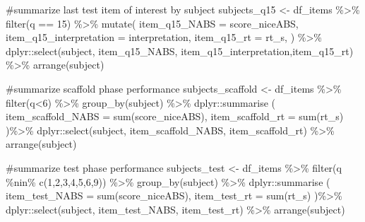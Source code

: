 \documentclass[
  letterpaper,
  DIV=11,
  numbers=noendperiod]{scrreprt}
\newenvironment{Shaded}{\begin{snugshade}}{\end{snugshade}}
\newcommand{\AttributeTok}[1]{\textcolor[rgb]{0.40,0.45,0.13}{#1}}
\newcommand{\CommentTok}[1]{\textcolor[rgb]{0.37,0.37,0.37}{#1}}
\newcommand{\DecValTok}[1]{\textcolor[rgb]{0.68,0.00,0.00}{#1}}
\newcommand{\FunctionTok}[1]{\textcolor[rgb]{0.28,0.35,0.67}{#1}}
\newcommand{\NormalTok}[1]{\textcolor[rgb]{0.00,0.23,0.31}{#1}}
\newcommand{\OtherTok}[1]{\textcolor[rgb]{0.00,0.23,0.31}{#1}}
\newcommand{\SpecialCharTok}[1]{\textcolor[rgb]{0.37,0.37,0.37}{#1}}
\begin{document}
\begin{Shaded}
\begin{Highlighting}[]
\CommentTok{\#summarize last test item of interest by subject}
\NormalTok{subjects\_q15 }\OtherTok{\textless{}{-}}\NormalTok{ df\_items }\SpecialCharTok{\%\textgreater{}\%} \FunctionTok{filter}\NormalTok{(q }\SpecialCharTok{==} \DecValTok{15}\NormalTok{) }\SpecialCharTok{\%\textgreater{}\%} \FunctionTok{mutate}\NormalTok{(}
  \AttributeTok{item\_q15\_NABS =}\NormalTok{ score\_niceABS,}
  \AttributeTok{item\_q15\_interpretation =}\NormalTok{ interpretation,}
  \AttributeTok{item\_q15\_rt =}\NormalTok{ rt\_s,}
\NormalTok{) }\SpecialCharTok{\%\textgreater{}\%}\NormalTok{ dplyr}\SpecialCharTok{::}\FunctionTok{select}\NormalTok{(subject, item\_q15\_NABS, item\_q15\_interpretation,item\_q15\_rt) }\SpecialCharTok{\%\textgreater{}\%} \FunctionTok{arrange}\NormalTok{(subject)}

\CommentTok{\#summarize scaffold phase performance}
\NormalTok{subjects\_scaffold }\OtherTok{\textless{}{-}}\NormalTok{ df\_items }\SpecialCharTok{\%\textgreater{}\%} \FunctionTok{filter}\NormalTok{(q}\SpecialCharTok{\textless{}}\DecValTok{6}\NormalTok{)  }\SpecialCharTok{\%\textgreater{}\%} \FunctionTok{group\_by}\NormalTok{(subject) }\SpecialCharTok{\%\textgreater{}\%}\NormalTok{ dplyr}\SpecialCharTok{::}\FunctionTok{summarise}\NormalTok{ (}
  \AttributeTok{item\_scaffold\_NABS =} \FunctionTok{sum}\NormalTok{(score\_niceABS),}
  \AttributeTok{item\_scaffold\_rt =} \FunctionTok{sum}\NormalTok{(rt\_s)}
\NormalTok{)}\SpecialCharTok{\%\textgreater{}\%}\NormalTok{ dplyr}\SpecialCharTok{::}\FunctionTok{select}\NormalTok{(subject, item\_scaffold\_NABS, item\_scaffold\_rt) }\SpecialCharTok{\%\textgreater{}\%} \FunctionTok{arrange}\NormalTok{(subject)}

\CommentTok{\#summarize test phase performance}
\NormalTok{subjects\_test }\OtherTok{\textless{}{-}}\NormalTok{ df\_items }\SpecialCharTok{\%\textgreater{}\%} \FunctionTok{filter}\NormalTok{(q }\SpecialCharTok{\%nin\%} \FunctionTok{c}\NormalTok{(}\DecValTok{1}\NormalTok{,}\DecValTok{2}\NormalTok{,}\DecValTok{3}\NormalTok{,}\DecValTok{4}\NormalTok{,}\DecValTok{5}\NormalTok{,}\DecValTok{6}\NormalTok{,}\DecValTok{9}\NormalTok{)) }\SpecialCharTok{\%\textgreater{}\%} \FunctionTok{group\_by}\NormalTok{(subject) }\SpecialCharTok{\%\textgreater{}\%}\NormalTok{ dplyr}\SpecialCharTok{::}\FunctionTok{summarise}\NormalTok{ (}
  \AttributeTok{item\_test\_NABS =} \FunctionTok{sum}\NormalTok{(score\_niceABS),}
  \AttributeTok{item\_test\_rt =} \FunctionTok{sum}\NormalTok{(rt\_s)}
\NormalTok{)}\SpecialCharTok{\%\textgreater{}\%}\NormalTok{ dplyr}\SpecialCharTok{::}\FunctionTok{select}\NormalTok{(subject, item\_test\_NABS, item\_test\_rt) }\SpecialCharTok{\%\textgreater{}\%} \FunctionTok{arrange}\NormalTok{(subject)}


\end{Highlighting}
\end{Shaded}
\end{document}
